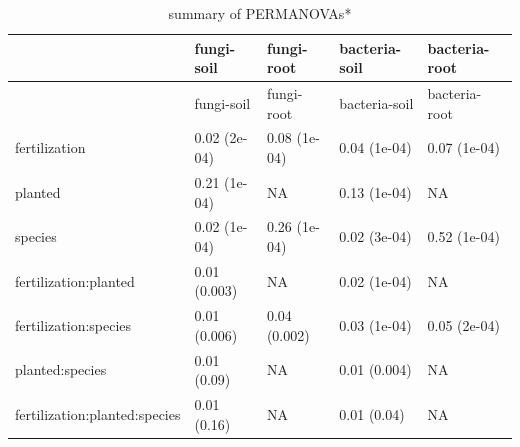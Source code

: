 \documentclass[11pt,]{article}
\begin{document}
\begin{longtable}[]{@{}lllll@{}}
\caption{summary of PERMANOVAs*}\tabularnewline
\toprule
& fungi-soil & fungi-root & bacteria-soil & bacteria-root\tabularnewline
\midrule
\endfirsthead
\toprule
& fungi-soil & fungi-root & bacteria-soil & bacteria-root\tabularnewline
\midrule
\endhead
fertilization & 0.02 (2e-04) & 0.08 (1e-04) & 0.04 (1e-04) & 0.07
(1e-04)\tabularnewline
planted & 0.21 (1e-04) & NA & 0.13 (1e-04) & NA\tabularnewline
species & 0.02 (1e-04) & 0.26 (1e-04) & 0.02 (3e-04) & 0.52
(1e-04)\tabularnewline
fertilization:planted & 0.01 (0.003) & NA & 0.02 (1e-04) &
NA\tabularnewline
fertilization:species & 0.01 (0.006) & 0.04 (0.002) & 0.03 (1e-04) &
0.05 (2e-04)\tabularnewline
planted:species & 0.01 (0.09) & NA & 0.01 (0.004) & NA\tabularnewline
fertilization:planted:species & 0.01 (0.16) & NA & 0.01 (0.04) &
NA\tabularnewline
\bottomrule
\end{longtable}
\end{document}
